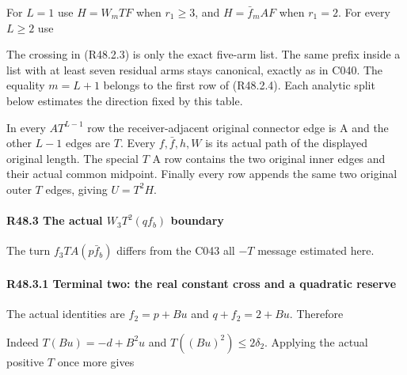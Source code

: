 For \(L=1\) use \(H=W_m TF\) when \(r_1\ge 3\), and \(H=\bar f_m AF\) when \(r_1=2\). For every \(L\ge 2\) use


The crossing in (R48.2.3) is only the exact five-arm list. The same prefix inside a list with at least seven residual arms stays canonical, exactly as in C040. The equality \(m=L+1\) belongs to the first row of (R48.2.4). Each analytic split below estimates the direction fixed by this table.

In every \(A T^{L-1}\) row the receiver-adjacent original connector edge is A and the other \(L-1\) edges are \(T\). Every \(f,\allowbreak \allowbreak \bar f,\allowbreak \allowbreak h,\allowbreak \allowbreak W\) is its actual path of the displayed original length. The special \(T\) A row contains the two original inner edges and their actual common midpoint. Finally every row appends the same two original outer \(T\) edges, giving \(U=T^2H\).

\paragraph{R48.3 The actual \(W_{3}\label{part:R48.3} T^2(q f_b)\) boundary}

The turn \(f_{3} T A(p \bar f_b)\) differs from the C043 all \(-T\) message estimated here.

\paragraph{R48.3.1 Terminal two: the real constant cross and a quadratic reserve}

The actual identities are \(f_{2}=p+Bu\) and \(q+f_{2}=2+Bu\). Therefore


Indeed \(T(Bu)=-d+B^2u\) and \(T((Bu)^2)\le 2\delta_2\). Applying the actual positive \(T\) once more gives


